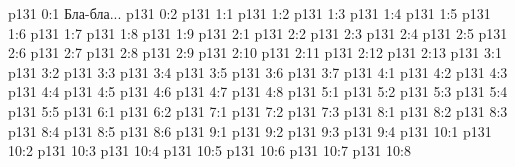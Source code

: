 \author{Промежуточные создания}
\vs p131 0:1  Бла-бла...
\vs p131 0:2 
\vs p131 1:1 
\vs p131 1:2 \pc 
\vs p131 1:3 
\vs p131 1:4 
\vs p131 1:5 
\vs p131 1:6 
\vs p131 1:7 
\vs p131 1:8 
\vs p131 1:9 
\vs p131 2:1 
\vs p131 2:2 \pc 
\vs p131 2:3 
\vs p131 2:4 
\vs p131 2:5 
\vs p131 2:6 
\vs p131 2:7 
\vs p131 2:8 
\vs p131 2:9 
\vs p131 2:10 
\vs p131 2:11 
\vs p131 2:12 
\vs p131 2:13 
\vs p131 3:1 
\vs p131 3:2 \pc 
\vs p131 3:3 
\vs p131 3:4 
\vs p131 3:5 
\vs p131 3:6 
\vs p131 3:7 
\vs p131 4:1 
\vs p131 4:2 \pc 
\vs p131 4:3 
\vs p131 4:4 
\vs p131 4:5 
\vs p131 4:6 
\vs p131 4:7 
\vs p131 4:8 
\vs p131 5:1 
\vs p131 5:2 \pc 
\vs p131 5:3 
\vs p131 5:4 
\vs p131 5:5 
\vs p131 6:1 
\vs p131 6:2 \pc 
{}
\vs p131 7:1 
\vs p131 7:2 \pc 
\vs p131 7:3 
\vs p131 8:1 
\vs p131 8:2 \pc 
\vs p131 8:3 
\vs p131 8:4 
\vs p131 8:5 
\vs p131 8:6 
\vs p131 9:1 
\vs p131 9:2 \pc 
\vs p131 9:3 
\vs p131 9:4 
\vs p131 10:1 
\vs p131 10:2 \pc 
\vs p131 10:3 
\vs p131 10:4 
\vs p131 10:5 
\vs p131 10:6 
\vs p131 10:7 
\vs p131 10:8 
\quizlink
